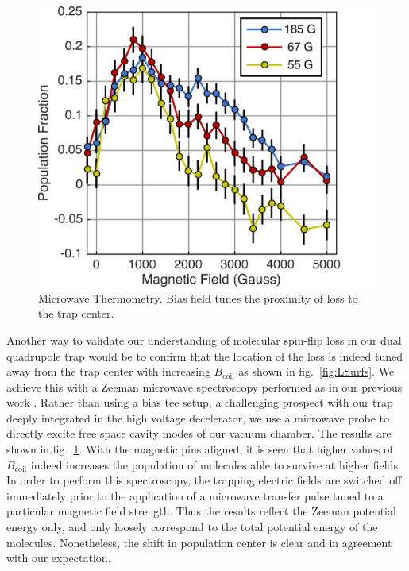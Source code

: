 \documentclass[%
 reprint,
 amsmath,amssymb,
 aps,
prl,
]{revtex4-1}
\begin{document}
\begin{figure}[tb]
\includegraphics[width=\linewidth]{MWSpec/MW-therm-dave.png}%
\caption{
Microwave Thermometry. Bias field tunes the proximity of loss to the trap center. 
\label{fig:spec}}
\end{figure}

Another way to validate our understanding of molecular spin-flip loss in our dual quadrupole trap would be to confirm that the location of the loss is indeed tuned away from the trap center with increasing $B_\text{coil}$ as shown in fig.~\ref{fig:LSurfs}. We achieve this with a Zeeman microwave spectroscopy performed as in our previous work \cite{Stuhl2012evap}. Rather than using a bias tee setup, a challenging prospect with our trap deeply integrated in the high voltage decelerator, we use a microwave probe to directly excite free space cavity modes of our vacuum chamber. The results are shown in fig.~\ref{fig:spec}. With the magnetic pins aligned, it is seen that higher values of $B_{\text{coil}}$ indeed increases the population of molecules able to survive at higher fields. In order to perform this spectroscopy, the trapping electric fields are switched off immediately prior to the application of a microwave transfer pulse tuned to a particular magnetic field strength. Thus the results reflect the Zeeman potential energy only, and only loosely correspond to the total potential energy of the molecules. Nonetheless, the shift in population center is clear and in agreement with our expectation.  %
\end{document}
